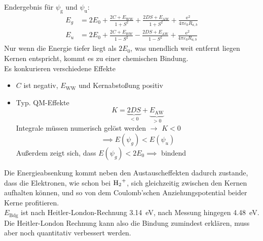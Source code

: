 Endergebnis für $ \psi_{\text{g}}$ und $ \psi_{\text{u}}$:
\begin{align}
	\label{3.51}
	E_{g} &= 2E_0 + \frac{2C + E_{\text{WW}}}{1 + S^2} + \frac{2DS + E_{\text{AW}}}{1 + S^2} + \frac{\mathrm{e}^2}{4 \pi \varepsilon_0 R_{a,b}} \\
	\label{3.52}
	E_{u} &= 2E_0 + \frac{2C + E_{WW}}{1- S^2}- \frac{2DS + E_{\text{AW}}}{1-S^2} + \frac{\mathrm{e}^2}{4 \pi \varepsilon_{0} R_{a,b}} 
\end{align}
Nur wenn die Energie tiefer liegt als $2 E_0$, was unendlich weit entfernt liegen Kernen entspricht, kommt es zu einer chemischen Bindung.\\
Es konkurieren verschiedene Effekte 
\begin{itemize}
	\item $C$ ist negativ, $E_{\text{WW}}$ und Kernabstoßung positiv
	\item Typ. QM-Effekte
		$$
		K = \underbrace{2DS}_{<0} + \underbrace{E_{\text{AW}}}_{>0} 
		$$ 
		Integrale müssen numerisch gelöst werden $\to $ $K < 0$
 $$
\implies E\left( \psi_{g} \right) < E\left( \psi_{u} \right) 
$$ 
Außerdem zeigt sich, dass $E \left( \psi_{g} \right) < 2 E_0 \implies$ bindend
\begin{figure}[H]
    \centering
    \label{fig:vl05_abb2_bind_abind}
\end{figure}
\end{itemize}
Die Energieabsenkung kommt neben den Austauscheffekten dadurch zustande, dass die Elektronen, wie schon bei $\ce{H2+}$, sich gleichzeitig zwischen den Kernen aufhalten können, und so von dem Coulomb'schen Anziehungspotential beider Kerne profitieren.\\
$E_{\text{Bdg}}$ ist nach Heitler-London-Rechnung \SI{3,14}{\electronvolt}, nach Messung hingegen \SI{4,48}{\electronvolt}.\\
Die Heitler-London Rechnung kann also die Bindung zumindest erklären, muss aber noch quantitativ verbessert werden.

